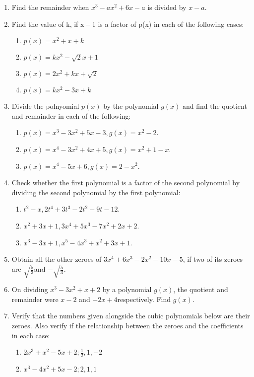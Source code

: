 \renewcommand{\theequation}{\theenumi}
\begin{enumerate}[label=\arabic*.,ref=\thesubsection.\theenumi]
\item Find the remainder when $x^3-ax^2 +6x-a$ is divided by $x-a$.
\item Find the value of k, if x – 1 is a factor of p(x) in each of the following cases: 
\begin{enumerate}
\item $p(x) = x^2 + x + k$
\item $p(x) = kx^2-\sqrt{2}x+1$
\item $p(x) = 2x^2 + kx + \sqrt{2}$
\item $p(x) = kx^2  - 3x + k$
\end{enumerate}
\item Divide the polnyomial $p(x)$ by the polynomial $g(x)$ and find the quotient and remainder in each of the following:
\begin{enumerate}
\item $p(x) = x^3-3x^2+5x-3, g(x) = x^2-2$.
\item $p(x) = x^4-3x^2+4x+5, g(x) = x^2+1-x$.
\item $p(x) = x^4-5x+6, g(x) = 2-x^2$.
\end{enumerate}
\item Check whether the first polynomial is a factor of the second polynomial by dividing the second polynomial by the first polynomial:
\begin{enumerate}
\item $t^2-x,2t^4+3t^3-2t^2-9t-12$.
\item $x^2+3x+1, 3x^4+5x^3-7x^2+2x+2$.
\item $x^3-3x+1, x^5-4x^3+x^2+3x+1$.
\end{enumerate}
%
\item Obtain all the other zeroes of $3x^4+6x^3-2x^2-10x-5$, if two of its zeroes are $\sqrt{\frac{5}{3}}$and $-\sqrt{\frac{5}{3}}$.
\item On dividing $x^3-3x^2+x+2$ by a polynomial $g(x)$, the quotient and remainder were $x-2$ and $-2x+4$respectively.  Find $g(x)$.
\item Verify that the numbers given alongside the cubic polynomials below are their zeroes.  Also verify if the relationship between the zeroes and the coefficients in each case:
\begin{enumerate}
\item $2x^3+x^2-5x+2; \frac{1}{2}, 1, -2$
\item $x^3-4x^2+5x-2; 2, 1, 1$

\end{enumerate}
\end{enumerate}
